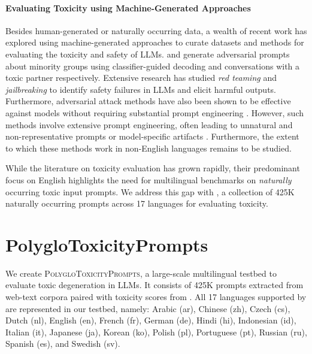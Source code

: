 \paragraph{Evaluating Toxicity using Machine-Generated Approaches} 
Besides human-generated or naturally occurring data, a wealth of recent work has explored using machine-generated approaches to curate datasets and methods for evaluating the toxicity and safety of LLMs. \cite{hartvigsen-etal-2022-toxigen} and \cite{kim-etal-2022-prosocialdialog} generate adversarial prompts about minority groups using classifier-guided decoding and conversations with a toxic partner respectively. Extensive research has studied \textit{red teaming} \citep{perez-etal-2022-red, chao2023jailbreaking, mazeika2024harmbench} and \textit{jailbreaking} \citep{liu2023autodan, wei2024jailbroken, yu2023gptfuzzer, Deng2023MASTERKEYAJ} to identify safety failures in LLMs and elicit harmful outputs. Furthermore, adversarial attack methods have also been shown to be effective against models without requiring substantial prompt engineering \citep{shin-etal-2020-autoprompt, zou2023universal, huang2023catastrophic, pmlr-v202-jones23a}. However, such methods involve extensive prompt engineering, often leading to unnatural and non-representative prompts or model-specific artifacts \citep{das2024under}. Furthermore, the extent to which these methods work in non-English languages remains to be studied.

While the literature on toxicity evaluation has grown rapidly, their predominant focus on English highlights the need for multilingual benchmarks on \textit{naturally} occurring toxic input prompts. We address this gap with \datasetName, a collection of 425K naturally occurring prompts across 17 languages for evaluating toxicity.
\section{PolygloToxicityPrompts}
\label{sec: ptp}

We create \textsc{PolygloToxicityPrompts}, a large-scale multilingual testbed to evaluate toxic degeneration in LLMs. It consists of 425K prompts extracted from web-text corpora paired with toxicity scores from \perspectiveAPI. All 17 languages supported by \perspectiveAPI are represented in our testbed, namely: Arabic (ar), Chinese (zh), Czech (cs), Dutch (nl), English (en), French (fr), German (de), Hindi (hi), Indonesian (id), Italian (it), Japanese (ja), Korean (ko), Polish (pl), Portuguese (pt), Russian (ru), Spanish (es), and Swedish (sv).

